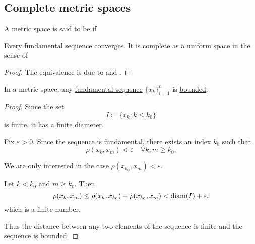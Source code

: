 \subsection{Complete metric spaces}\label{subsec:metric_convergence}

\begin{definition}\label{def:complete_metric_space}
  A metric space is said to be  if
  \begin{thmenum}
     Every fundamental sequence converges.
     It is complete as a uniform space in the sense of 
  \end{thmenum}
\end{definition}
\begin{proof}
  The equivalence is due to  and .
\end{proof}

\begin{proposition}\label{thm:fundamental_sequence_is_bounded}
  In a metric space, any \hyperref[def:fundamental_net]{fundamental sequence} \( \{ x_k \}_{i=1}^n \) is \hyperref[def:metric_space/bounded_sequence]{bounded}.
\end{proposition}
\begin{proof}
  Since the set
  \begin{equation*}
    I \coloneqq \{ x_k \colon k \leq k_0 \}
  \end{equation*}
  is finite, it has a finite \hyperref[def:metric_space/diameter]{diameter}.

  Fix \( \varepsilon > 0 \). Since the sequence is fundamental, there exists an index \( k_0 \) such that
  \begin{equation*}
    \rho(x_k, x_m) < \varepsilon \quad\forall k, m \geq k_0.
  \end{equation*}

  We are only interested in the case \( \rho(x_{k_0}, x_m) < \varepsilon \).

  Let \( k < k_0 \) and \( m \geq k_0 \). Then
  \begin{equation*}
    \rho(x_k, x_m) \leq \rho(x_k, x_{k_0}) + \rho(x_{k_0}, x_m) < \operatorname{diam}(I) + \varepsilon,
  \end{equation*}
  which is a finite number.

  Thus the distance between any two elements of the sequence is finite and the sequence is bounded.
\end{proof}

